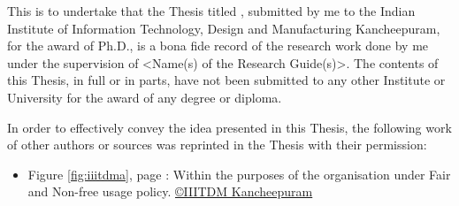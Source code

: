 \certificate

\begin{doublespace}
\noindent This is to undertake that the Thesis titled \MakeUppercase{\textbf{\MyTitle}}, submitted by me %
to the Indian Institute of Information Technology, Design and Manufacturing Kancheepuram, for
the award of Ph.D., is a bona fide record of the research work done by me under the supervision of <Name(s) of the Research Guide(s)>.  The contents of this Thesis, in full or in parts, have not been submitted to any other Institute or University for the award of any degree or diploma.



In order to effectively convey the idea presented in this Thesis, the following work of other
authors or sources was reprinted in the Thesis with their permission:
\begin{itemize}
	\item Figure \ref{fig:iiitdma}, page \pageref{fig:iiitdma}: Within the purposes of the organisation under Fair and Non-free usage policy. \href{https://en.wikipedia.org/w/index.php?curid=26650718}{\copyright IIITDM Kancheepuram} 
\end{itemize}
\end{doublespace}

\vspace*{0.2in}

